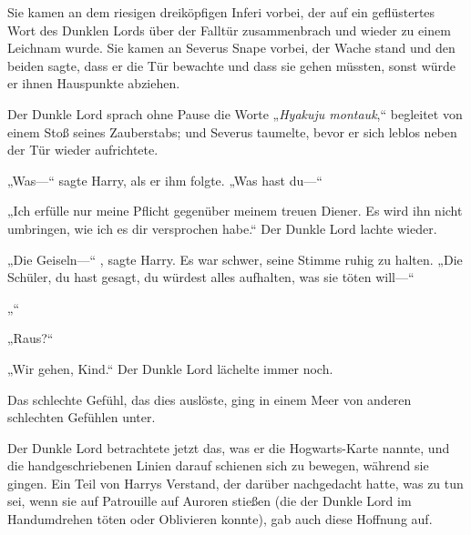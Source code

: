 Sie kamen an dem riesigen dreiköpfigen Inferi vorbei, der auf ein geflüstertes Wort des Dunklen Lords über der Falltür zusammenbrach und wieder zu einem Leichnam wurde.
Sie kamen an Severus Snape vorbei, der Wache stand und den beiden sagte, dass er die Tür bewachte und dass sie gehen müssten, sonst würde er ihnen Hauspunkte abziehen.

Der Dunkle Lord sprach ohne Pause die Worte „\emph{Hyakuju montauk},“ begleitet von einem Stoß seines Zauberstabs; und Severus taumelte, bevor er sich leblos neben der Tür wieder aufrichtete.

„Was—“ sagte Harry, als er ihm folgte. „Was hast du—“

„Ich erfülle nur meine Pflicht gegenüber meinem treuen Diener. Es wird ihn nicht umbringen, wie ich es dir versprochen habe.“
Der Dunkle Lord lachte wieder.

„Die Geiseln—“ , sagte Harry.
Es war schwer, seine Stimme ruhig zu halten.
„Die Schüler, du hast gesagt, du würdest alles aufhalten, was sie töten will—“

„“

„Raus?“

„Wir gehen, Kind.“ Der Dunkle Lord lächelte immer noch.

Das schlechte Gefühl, das dies auslöste, ging in einem Meer von anderen schlechten Gefühlen unter.

Der Dunkle Lord betrachtete jetzt das, was er die Hogwarts-Karte nannte, und die handgeschriebenen Linien darauf schienen sich zu bewegen, während sie gingen. Ein Teil von Harrys Verstand, der darüber nachgedacht hatte, was zu tun sei, wenn sie auf Patrouille auf Auroren stießen (die der Dunkle Lord im Handumdrehen töten oder Oblivieren konnte), gab auch diese Hoffnung auf.

